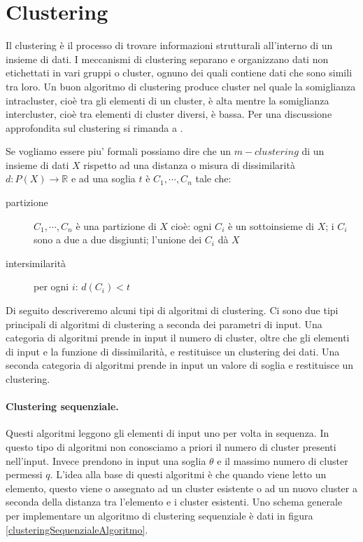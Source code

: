 


\section{Clustering}
\label{clustering}
Il clustering \`e il processo di trovare informazioni strutturali all'interno di un insieme di dati. 
I meccanismi di clustering separano e organizzano dati non etichettati in vari gruppi o cluster, ognuno dei quali contiene dati che sono simili tra loro. 
Un buon algoritmo di clustering produce cluster nel quale la somiglianza intracluster, cio\`e tra gli elementi di un cluster, \`e alta mentre la somiglianza intercluster, cio\`e tra elementi di cluster diversi, \`e bassa. 
Per una discussione approfondita sul clustering si rimanda a \cite{PatternRecognition}.

Se vogliamo essere piu' formali possiamo dire che un $m-clustering$ di un insieme di dati $X$ rispetto ad una distanza o misura di dissimilarit\`a $d:P(X)\rightarrow \mathbb{R}$ e ad una soglia $t$ \`e $C_{1}, \cdots, C_{n}$ tale che:
\begin{description}
  \item[partizione]
    $C_{1}, \cdots, C_{n}$ \`e una partizione di $X$ cio\`e: ogni $C_{i}$ \`e un sottoinsieme di $X$; i $C_{i}$ sono a due a due disgiunti; l'unione dei $C_{i}$ d\`a $X$
  \item[intersimilarit\`a]
    per ogni $i$: $d(C_{i})<t$
\end{description}



  
Di seguito descriveremo alcuni tipi di algoritmi di clustering. 
Ci sono due tipi principali di algoritmi di clustering a seconda dei parametri di input. 
Una categoria di algoritmi prende in input il numero di cluster, oltre che gli elementi di input e la funzione di dissimilarit\`a, e restituisce un clustering dei dati. 
Una seconda categoria di algoritmi prende in input un valore di soglia e restituisce un clustering.
\paragraph{Clustering sequenziale.}
  Questi algoritmi leggono gli elementi di input uno per volta in sequenza. 
  In questo tipo di algoritmi non conosciamo a priori il numero di cluster presenti nell'input. 
  Invece prendono in input una soglia $\theta$ e il massimo numero di cluster permessi $q$. 
  L'idea alla base di questi algoritmi \`e che quando viene letto un elemento, questo viene o assegnato ad un cluster esistente o ad un nuovo cluster a seconda della distanza tra l'elemento e i cluster esistenti. 
  Uno schema generale per implementare un algoritmo di clustering sequenziale \`e dati in figura \ref{clusteringSequenzialeAlgoritmo}.

